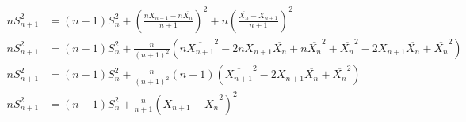 \documentclass[11pt,letterpaper,titlepage]{article}
\begin{document}
\begin{enumerate}
\begin{enumerate}
\begin{equation*}
\begin{aligned}
                n S_{n+1}^2 &= (n - 1) S_n^2 + (\frac{n X_{n+1} - n \overline{X_n}}{n+1})^2 + n (\frac{\overline{X_n} - X_{n+1}}{n+1})^2 \\
                n S_{n+1}^2 &= (n - 1) S_n^2 + \frac{n}{(n + 1)^2} (n \overline{X_{n+1}}^2 - 2 n X_{n+1} \overline{X_n} + n \overline{X_n}^2 + \overline{X_n}^2 - 2 X_{n+1} \overline{X_n} + \overline{X_n}^2) \\
                 n S_{n+1}^2 &= (n - 1) S_n^2 + \frac{n}{(n + 1)^2} (n + 1) (\overline{X_{n+1}}^2 - 2 X_{n+1} \overline{X_n} + \overline{X_n}^2) \\
                 n S_{n+1}^2 &= (n - 1) S_n^2  + \frac{n}{n + 1} (X_{n+1} - \overline{X_n}^2)^2
            \end{aligned}
        \end{equation*}
        
    \end{enumerate}
    
\end{enumerate}
\end{document}
